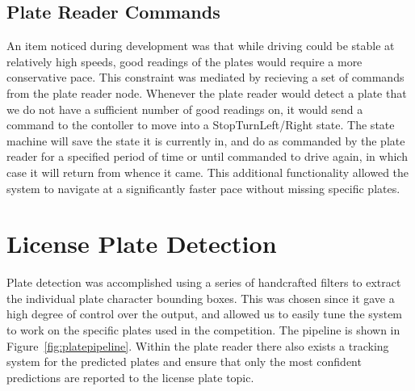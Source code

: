 \documentclass[titlepage, twocolumn]{article}
\begin{document}
    \subsection{Plate Reader Commands} \label{platereadercontrol}

    An item noticed during development was that while driving could be stable at relatively high speeds, good readings of the plates would require a more conservative pace. This constraint was mediated by recieving a set of commands from the plate reader node. Whenever the plate reader would detect a plate that we do not have a sufficient number of good readings on, it would send a command to the contoller to move into a StopTurn{Left/Right} state. The state machine will save the state it is currently in, and do as commanded by the plate reader for a specified period of time or until commanded to drive again, in which case it will return from whence it came. This additional functionality allowed the system to navigate at a significantly faster pace without missing specific plates.


\section{License Plate Detection}

Plate detection was accomplished using a series of handcrafted filters to extract the individual plate character bounding boxes. This was chosen since it gave a high degree of control over the output, and allowed us to easily tune the system to work on the specific plates used in the competition. The pipeline is shown in Figure~\ref{fig:platepipeline}. Within the plate reader there also exists a tracking system for the predicted plates and ensure that only the most confident predictions are reported to the license plate topic.
\end{document}
